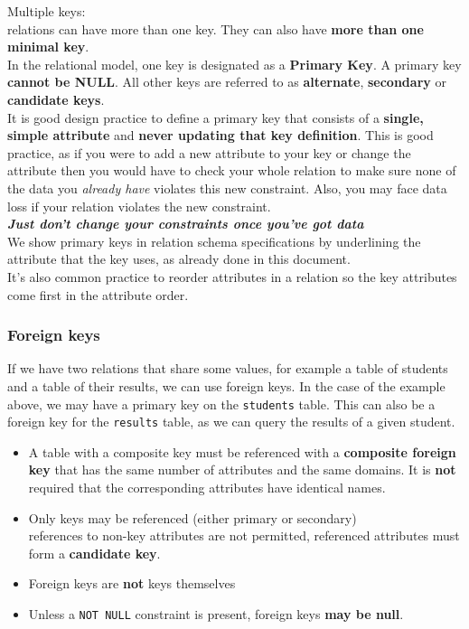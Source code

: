 \documentclass{article}
\begin{document}
Multiple keys:
\\relations can have more than one key. They can also have \textbf{more than one minimal key}.
\\In the relational model, one key is designated as a \textbf{Primary Key}. A primary key \textbf{cannot be NULL}. All other keys are referred to as \textbf{alternate}, \textbf{secondary} or \textbf{candidate keys}.
\\It is good design practice to define a primary key that consists of a \textbf{single, simple attribute} and \textbf{never updating that key definition}.
This is good practice, as if you were to add a new attribute to your key or change the attribute then you would have to check your whole relation to make sure none of the data you \textit{already have} violates this new constraint. Also, you may face data loss if your relation violates the new constraint.
\\\textbf{\textit{Just don't change your constraints once you've got data}}
\\We show primary keys in relation schema specifications by underlining the attribute that the key uses, as already done in this document.
\\It's also common practice to reorder attributes in a relation so the key attributes come first in the attribute order.

\subsubsection*{Foreign keys}
If we have two relations that share some values, for example a table of students and a table of their results, we can use foreign keys. In the case of the example above, we may have a primary key on the \texttt{students} table. This can also be a foreign key for the \texttt{results} table, as we can query the results of a given student.
\begin{itemize}
    \item A table with a composite key must be referenced with a \textbf{composite foreign key} that has the same number of attributes and the same domains. It is \textbf{not} required that the corresponding attributes have identical names.
    \item Only keys may be referenced (either primary or secondary)
    \\references to non-key attributes are not permitted, referenced attributes must form a \textbf{candidate key}.
    \item Foreign keys are \textbf{not} keys themselves
    \item Unless a \verb|NOT NULL| constraint is present, foreign keys \textbf{may be null}.
\end{itemize}
\end{document}
